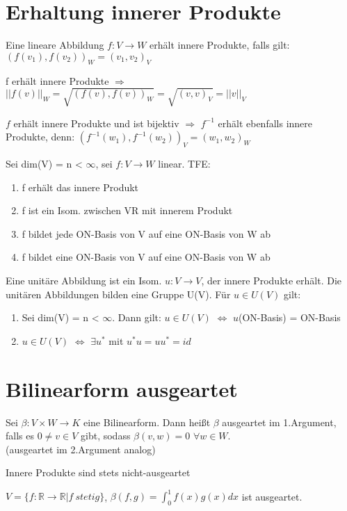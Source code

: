 \section{Erhaltung innerer Produkte}
\begin{theorem}
\leavevmode
\begin{compactitem}
\item Eine lineare Abbildung $f: V \to W$ erhält innere Produkte, falls gilt: $(f(v_1), f(v_2))_W = (v_1, v_2)_V$
\item f erhält innere Produkte $\Rightarrow$ $||f(v)||_W = \sqrt{(f(v), f(v))_W} = \sqrt{(v,v)_V} = ||v||_V$
\item $f$ erhält innere Produkte und ist bijektiv $\Rightarrow$ $f^{-1}$ erhält ebenfalls innere Produkte, denn: $(f^{-1}(w_1), f^{-1}(w_2))_V = (w_1, w_2)_W$
\item Sei dim(V) = n < $\infty$, sei $f: V \to W$ linear. TFE:
\begin{enumerate}
\item f erhält das innere Produkt
\item f ist ein Isom. zwischen VR mit innerem Produkt
\item f bildet jede ON-Basis von V auf eine ON-Basis von W ab
\item f bildet eine ON-Basis von V auf eine ON-Basis von W ab
\end{enumerate}
Eine unitäre Abbildung ist ein Isom. $u: V \to V$, der innere Produkte erhält.
Die unitären Abbildungen bilden eine Gruppe U(V). Für $u \in U(V)$ gilt:
\begin{enumerate}
\item Sei dim(V) = n < $\infty$. Dann gilt: $u \in U(V)$ $\Leftrightarrow$ $u$(ON-Basis) = ON-Basis
\item $u \in U(V)$ $\Leftrightarrow$ $\exists u^*$ mit $u^*u=uu^*=id$
\end{enumerate}
\end{compactitem}
\end{theorem}

\section{Bilinearform ausgeartet}
\begin{definition}
Sei $\beta: V \times W \to K$ eine Bilinearform. Dann heißt $\beta$ ausgeartet im 1.Argument, falls es $0 \neq v \in V$ gibt, sodass $\beta(v,w) = 0$ $\forall w \in W$.\\
(ausgeartet im 2.Argument analog)
\end{definition}
\begin{remark}
\leavevmode
\begin{compactitem}
\item Innere Produkte sind stets nicht-ausgeartet
\item $V = \{ f: \mathbb{R} \to \mathbb{R} | f~stetig \}$, $\beta(f,g) = \displaystyle\int_0^1 f(x) g(x) dx$ ist ausgeartet.
\end{compactitem}
\end{remark}
